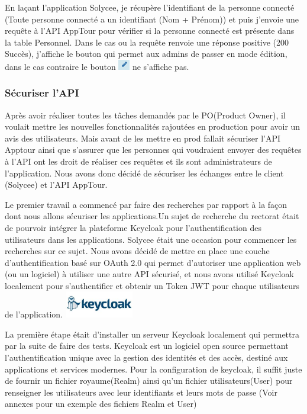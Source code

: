 \documentclass[12pt]{article}
\begin{document}
En laçant l'application Solycee, je récupère l'identifiant de la personne connecté (Toute personne connecté a un identifiant (Nom + Prénom)) et puis j’envoie une requête à l'API AppTour pour vérifier si la personne connecté est présente dans la table Personnel. Dans le cas ou la requête renvoie une réponse positive (200 Succès), j'affiche le bouton qui permet aux admins de passer en mode édition, dans le cas contraire le bouton \includegraphics[width=5mm,scale=0.5]{diagrammes/Bouton_modeEdition.png} ne s'affiche pas. 



\subsubsection{Sécuriser l'API}


Après avoir réaliser toutes les tâches demandés par le PO(Product Owner), il voulait mettre les nouvelles fonctionnalités rajoutées en production pour avoir un avis des utilisateurs. Mais avant de les mettre en prod fallait sécuriser l'API Apptour ainsi que s'assurer que les personnes qui voudraient envoyer des requêtes à l'API ont les droit de réaliser ces requêtes et ils sont administrateurs de l'application. Nous avons donc décidé de sécuriser les échanges entre le client (Solycee) et l'API AppTour. 

Le premier travail a commencé par faire des recherches par rapport à la façon dont nous allons sécuriser les applications.Un sujet de recherche du rectorat était de pourvoir intégrer la plateforme Keycloak pour l'authentification des utilisateurs dans les applications. Solycee était une occasion pour commencer les recherches sur ce sujet.  Nous avons décidé de mettre en place une couche d'authentification basé sur OAuth 2.0 qui permet d'autoriser une application web (ou un logiciel) à utiliser une autre API sécurisé, et nous avons utilisé Keycloak localement pour s'authentifier et obtenir un Token JWT pour chaque utilisateurs de l'application.  \includegraphics[width=30mm,scale=0.5]{diagrammes/logo_Keycloak.jpeg}  

La première étape était  d'installer un serveur Keycloak localement qui permettra par la suite de faire des tests. Keycloak  est un logiciel open source permettant l'authentification unique avec la gestion des identités et des accès, destiné aux applications et services modernes. Pour la configuration de keycloak, il suffit juste de fournir un fichier  royaume(Realm) ainsi qu'un fichier utilisateurs(User) pour renseigner les utilisateurs  avec leur identifiants et leurs mots de passe (Voir annexes pour un exemple des fichiers Realm et User)
\end{document}
